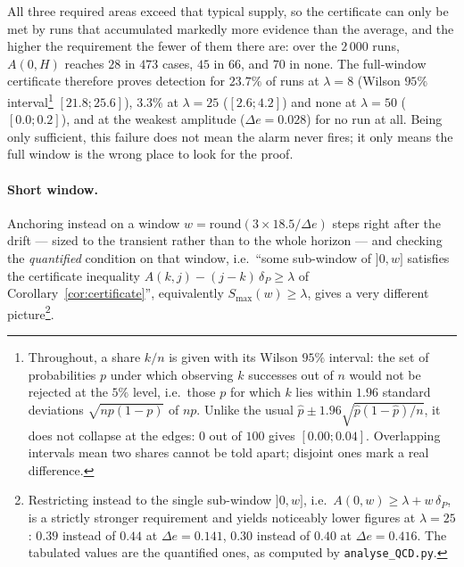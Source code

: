 \documentclass[10pt,a4paper]{article}
\begin{document}
All three required areas exceed that typical supply, so the certificate can only be met
by runs that accumulated markedly more evidence than the average, and the higher the
requirement the fewer of them there are: over the $2\,000$ runs, $A(0,H)$ reaches $28$
in $473$ cases, $45$ in $66$, and $70$ in none. The full-window certificate therefore
proves detection for $23.7\%$ of runs at $\lambda = 8$ (Wilson $95\%$
interval\footnote{Throughout, a share $k/n$ is given with its Wilson $95\%$ interval:
the set of probabilities $p$ under which observing $k$ successes out of $n$ would not be
rejected at the $5\%$ level, i.e.\ those $p$ for which $k$ lies within $1.96$ standard
deviations $\sqrt{np(1-p)}$ of $np$. Unlike the usual $\hat p \pm 1.96\sqrt{\hat p(1-\hat p)/n}$,
it does not collapse at the edges: $0$ out of $100$ gives $[0.00;0.04]$. Overlapping
intervals mean two shares cannot be told apart; disjoint ones mark a real difference.}
$[21.8;25.6]$), $3.3\%$ at $\lambda = 25$ ($[2.6;4.2]$) and none at $\lambda = 50$
($[0.0;0.2]$), and at the weakest amplitude ($\Delta e = 0.028$) for no run at all.
Being only sufficient, this failure does not mean the alarm never fires; it only means
the full window is the wrong place to look for the proof.

\paragraph{Short window.} Anchoring instead on a window
$w = \mathrm{round}(3 \times 18.5/\Delta e)$ steps right after the drift --- sized to the
transient rather than to the whole horizon --- and checking the \emph{quantified}
condition on that window, i.e.\ ``some sub-window of $]0,w]$ satisfies the
certificate inequality $A(k,j) - (j-k)\,\delta_P \ge \lambda$ of
Corollary~\ref{cor:certificate}'', equivalently $S_{\max}(w) \ge \lambda$, gives a very
different picture\footnote{Restricting instead to the single sub-window $]0,w]$, i.e.\
$A(0,w) \ge \lambda + w\,\delta_P$, is a strictly stronger requirement and yields
noticeably lower figures at $\lambda = 25$: $0.39$ instead of $0.44$ at
$\Delta e = 0.141$, $0.30$ instead of $0.40$ at $\Delta e = 0.416$. The tabulated values
are the quantified ones, as computed by \texttt{analyse\_QCD.py}.}.
\end{document}
